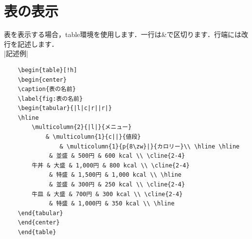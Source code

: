 \section{表の表示}
\label{sec:chart_table}
    表を表示する場合，table環境を使用します．一行は\&で区切ります．行端には改行を記述します．\\
    |記述例|
    \begin{verbatim}
    \begin{table}[!h]
    \begin{center}
    \caption{表の名前}
    \label{fig:表の名前}
    \begin{tabular}{|l|c|r||r|}
    \hline
        \multicolumn{2}{|l|}{メニュー} 
            & \multicolumn{1}{c||}{値段} 
                & \multicolumn{1}{p{8\zw}|}{カロリー}\\ \hline \hline
             & 並盛 & 500円 & 600 kcal \\ \cline{2-4}
        牛丼 & 大盛 & 1,000円 & 800 kcal \\ \cline{2-4}
             & 特盛 & 1,500円 & 1,000 kcal \\ \hline
             & 並盛 & 300円 & 250 kcal \\ \cline{2-4}
        牛皿 & 大盛 & 700円 & 300 kcal \\ \cline{2-4}
             & 特盛 & 1,000円 & 350 kcal \\ \hline
    \end{tabular}
    \end{center}
    \end{table}
    \end{verbatim}

